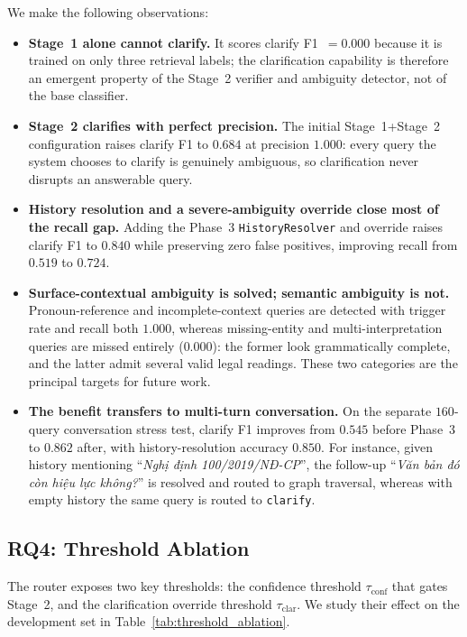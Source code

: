 ﻿\documentclass[11pt,twocolumn]{article}
\begin{document}
We make the following observations:
\begin{itemize}
  \item \textbf{Stage~1 alone cannot clarify.} It scores clarify
  F1~$=0.000$ because it is trained on only three retrieval labels; the
  clarification capability is therefore an emergent property of the
  Stage~2 verifier and ambiguity detector, not of the base classifier.

  \item \textbf{Stage~2 clarifies with perfect precision.} The initial
  Stage~1+Stage~2 configuration raises clarify F1 to $0.684$ at precision
  $1.000$: every query the system chooses to clarify is genuinely
  ambiguous, so clarification never disrupts an answerable query.

  \item \textbf{History resolution and a severe-ambiguity override close
  most of the recall gap.} Adding the Phase~3 \texttt{HistoryResolver} and
  override raises clarify F1 to $0.840$ while preserving zero false
  positives, improving recall from $0.519$ to $0.724$.

  \item \textbf{Surface-contextual ambiguity is solved; semantic
  ambiguity is not.} Pronoun-reference and incomplete-context queries are
  detected with trigger rate and recall both $1.000$, whereas
  missing-entity and multi-interpretation queries are missed entirely
  ($0.000$): the former look grammatically complete, and the latter admit
  several valid legal readings. These two categories are the principal
  targets for future work.

  \item \textbf{The benefit transfers to multi-turn conversation.} On the
  separate $160$-query conversation stress test, clarify F1 improves from
  $0.545$ before Phase~3 to $0.862$ after, with history-resolution
  accuracy $0.850$. For instance, given history mentioning
  ``\textit{Nghị định 100/2019/NĐ-CP}'', the follow-up
  ``\textit{Văn bản đó còn hiệu lực không?}'' is resolved and routed to
  graph traversal, whereas with empty history the same query is routed to
  \texttt{clarify}.
\end{itemize}

\subsection{RQ4: Threshold Ablation}
\label{subsec:rq4}

The router exposes two key thresholds: the confidence threshold
$\tau_{\mathrm{conf}}$ that gates Stage~2, and the clarification override
threshold $\tau_{\mathrm{clar}}$. We study their effect on the
development set in Table~\ref{tab:threshold_ablation}.
\end{document}
